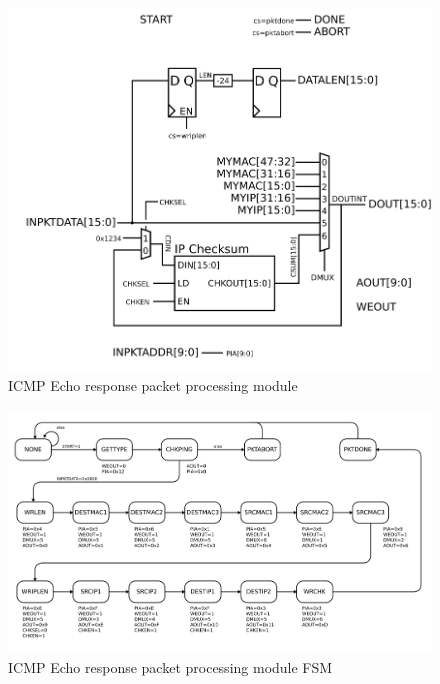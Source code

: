 \begin{figure}
\begin{centering}
\includegraphics[scale=0.8]{pingipwriter.svg}
\end{centering}
\caption{ICMP Echo response packet processing module}
\label{ping.ip}
\end{figure}

\begin{figure}
\begin{centering}
\includegraphics[scale=0.8]{pingipwriter.fsm.svg}
\end{centering}
\caption{ICMP Echo response packet processing module FSM}
\label{ping.ip.fsm}
\end{figure}


